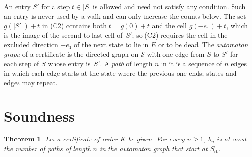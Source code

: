 \documentclass[11pt]{amsart}
\newtheorem{theorem}{Theorem}[section]
\theoremstyle{definition}
\theoremstyle{remark}
\numberwithin{equation}{section}
\begin{document}
An entry $S'$ for a step $t\in|S|$ is allowed and need not satisfy any condition. Such an entry is never used by a walk and can only increase the counts below. The set $g(|S'|)+t$ in (C2) contains both $t=g(0)+t$ and the cell $g(-e_1)+t$, which is the image of the second-to-last cell of~$S'$; so (C2) requires the cell in the excluded direction $-e_1$ of the next state to lie in $E$ or to be dead. The \emph{automaton graph} of a certificate is the directed graph on $\mathcal S$ with one edge from $S$ to $S'$ for each step of $S$ whose entry is~$S'$. A \emph{path} of length $n$ in it is a sequence of $n$ edges in which each edge starts at the state where the previous one ends; states and edges may repeat.

\section{Soundness}\label{sec:sound}

\begin{theorem}\label{thm:sound}
Let a certificate of order $K$ be given. For every $n\ge1$, $b_n$ is at most the number of paths of length $n$ in the automaton graph that start at $S_\mathrm{st}$.
\end{theorem}
\end{document}
